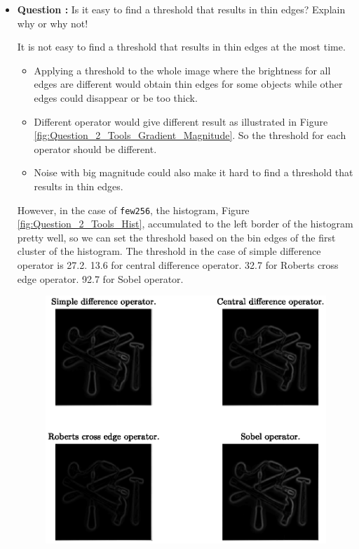 \documentclass[11pt,a4paper]{article}
\begin{document}
	\begin{itemize}
		\item\addtocounter{Counter}{1}\textbf{Question :} Is it easy to find a threshold that results in thin edges? Explain why or why not!
			\par It is not easy to find a threshold that results in thin edges at the most time.
			\begin{itemize}
				\item Applying a threshold to the whole image where the brightness for all edges are different would obtain thin edges for some objects while other edges could disappear or be too thick.
				\item Different operator would give different result as illustrated in Figure \ref{fig:Question_2_Tools_Gradient_Magnitude}. So the threshold for each operator should be different.
				\item Noise with big magnitude could also make it hard to find a threshold that results in thin edges.
			\end{itemize}
			\par However, in the case of \texttt{few256}, the histogram, Figure \ref{fig:Question_2_Tools_Hist}, accumulated to the left border of the histogram pretty well, so we can set the threshold based on the bin edges of the first cluster of the histogram. The threshold in the case of simple difference operator is 27.2. 13.6 for central difference operator. 32.7 for Roberts cross edge operator. 92.7 for Sobel operator.
		\begin{figure}[!ht]
			\centering
			\includegraphics[width=0.9\columnwidth]{Question_2_Tools_Gaussian_2-25.eps}

\end{figure}
\end{itemize}
\end{document}
